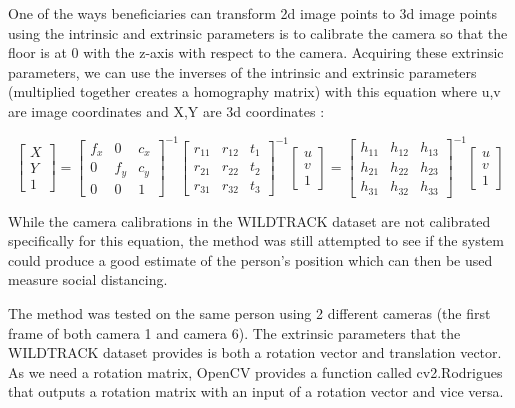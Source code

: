 \documentclass[12pt]{report}
\begin{document}
\vspace{2mm}

One of the ways beneficiaries can transform 2d image points to 3d image points using the intrinsic and extrinsic parameters is to calibrate the camera so that the floor is at 0 with the z-axis with respect to the camera. Acquiring these extrinsic parameters, we can use the inverses of the intrinsic and extrinsic parameters (multiplied together creates a homography matrix) with this equation where u,v are image coordinates and X,Y are 3d coordinates :

\begin{equation*}
\begin{bmatrix}
X \\
Y \\
1
\end{bmatrix}
=
\begin{bmatrix}
f_{x} & 0 & c_{x} \\
0 & f_{y} & c_{y} \\
0 & 0 & 1
\end{bmatrix}
^{-1}
\begin{bmatrix}
r_{11} & r_{12} & t_{1}\\
r_{21} & r_{22} & t_{2}\\
r_{31} & r_{32} & t_{3}
\end{bmatrix}
^{-1}
\begin{bmatrix}
u \\
v \\
1
\end{bmatrix}
=
\begin{bmatrix}
h_{11} & h_{12} & h_{13}\\
h_{21} & h_{22} & h_{23}\\
h_{31} & h_{32} & h_{33}
\end{bmatrix}
^{-1}
\begin{bmatrix}
u \\
v \\
1
\end{bmatrix}
\end{equation*}

While the camera calibrations in the WILDTRACK dataset are not calibrated specifically for this equation, the method was still attempted to see if the system could produce a good estimate of the person's position which can then be used measure social distancing.

\vspace{2mm}

The method was tested on the same person using 2 different cameras (the first frame of both camera 1 and camera 6). The extrinsic parameters that the WILDTRACK dataset provides is both a rotation vector and translation vector. As we need a rotation matrix, OpenCV provides a function called cv2.Rodrigues that outputs a rotation matrix with an input of a rotation vector and vice versa.
\end{document}
